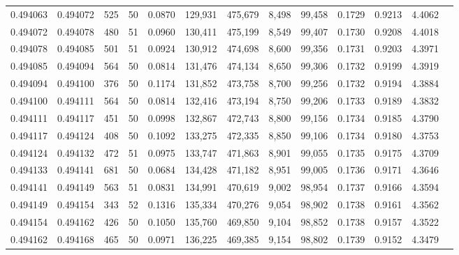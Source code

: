 \begin{tabular}{rrrrrrrrrrrrr}
0.494063 & 0.494072 &   525 &  50 &                                     0.0870 & 129,931 & 475,679 &   8,498 &  99,458 & 0.1729 & 0.9213 & 4.4062 \\
0.494072 & 0.494078 &   480 &  51 &                                     0.0960 & 130,411 & 475,199 &   8,549 &  99,407 & 0.1730 & 0.9208 & 4.4018 \\
0.494078 & 0.494085 &   501 &  51 &                                     0.0924 & 130,912 & 474,698 &   8,600 &  99,356 & 0.1731 & 0.9203 & 4.3971 \\
0.494085 & 0.494094 &   564 &  50 &                                     0.0814 & 131,476 & 474,134 &   8,650 &  99,306 & 0.1732 & 0.9199 & 4.3919 \\
0.494094 & 0.494100 &   376 &  50 &                                     0.1174 & 131,852 & 473,758 &   8,700 &  99,256 & 0.1732 & 0.9194 & 4.3884 \\
0.494100 & 0.494111 &   564 &  50 &                                     0.0814 & 132,416 & 473,194 &   8,750 &  99,206 & 0.1733 & 0.9189 & 4.3832 \\
0.494111 & 0.494117 &   451 &  50 &                                     0.0998 & 132,867 & 472,743 &   8,800 &  99,156 & 0.1734 & 0.9185 & 4.3790 \\
0.494117 & 0.494124 &   408 &  50 &                                     0.1092 & 133,275 & 472,335 &   8,850 &  99,106 & 0.1734 & 0.9180 & 4.3753 \\
0.494124 & 0.494132 &   472 &  51 &                                     0.0975 & 133,747 & 471,863 &   8,901 &  99,055 & 0.1735 & 0.9175 & 4.3709 \\
0.494133 & 0.494141 &   681 &  50 &                                     0.0684 & 134,428 & 471,182 &   8,951 &  99,005 & 0.1736 & 0.9171 & 4.3646 \\
0.494141 & 0.494149 &   563 &  51 &                                     0.0831 & 134,991 & 470,619 &   9,002 &  98,954 & 0.1737 & 0.9166 & 4.3594 \\
0.494149 & 0.494154 &   343 &  52 &                                     0.1316 & 135,334 & 470,276 &   9,054 &  98,902 & 0.1738 & 0.9161 & 4.3562 \\
0.494154 & 0.494162 &   426 &  50 &                                     0.1050 & 135,760 & 469,850 &   9,104 &  98,852 & 0.1738 & 0.9157 & 4.3522 \\
0.494162 & 0.494168 &   465 &  50 &                                     0.0971 & 136,225 & 469,385 &   9,154 &  98,802 & 0.1739 & 0.9152 & 4.3479 \\

\end{tabular}
